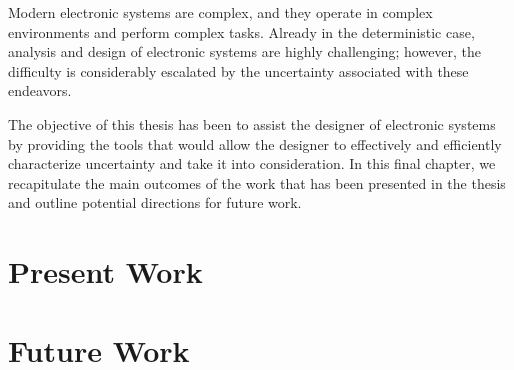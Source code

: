 Modern electronic systems are complex, and they operate in complex environments
and perform complex tasks. Already in the deterministic case, analysis and
design of electronic systems are highly challenging; however, the difficulty is
considerably escalated by the uncertainty associated with these endeavors.

The objective of this thesis has been to assist the designer of electronic
systems by providing the tools that would allow the designer to effectively and
efficiently characterize uncertainty and take it into consideration. In this
final chapter, we recapitulate the main outcomes of the work that has been
presented in the thesis and outline potential directions for future work.

\section{Present Work}

\section{Future Work}
